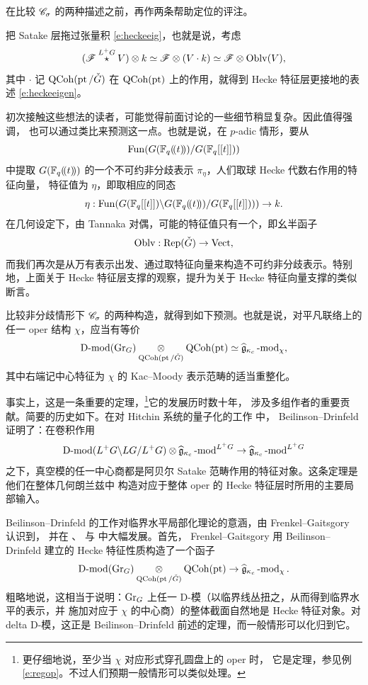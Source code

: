 在比较 $\mathscr{C}_\sigma$ 的两种描述之前，再作两条帮助定位的评注。

\begin{re}  把 Satake 层拖过张量积 \eqref{e:heckeeig}，也就是说，考虑
%
\[
     (\mathscr{F} \overset {L^+G} \star V) \otimes k \simeq \mathscr{F} \otimes (V \cdot k)
     \simeq
     \mathscr{F} \otimes \operatorname{Oblv}(V),
\]
%
其中 $\cdot$ 记 $\operatorname{QCoh}(\operatorname{pt}/\check{G})$ 在 $\operatorname{QCoh}(\operatorname{pt})$ 上的作用，就得到 Hecke 特征层更接地的表述
\eqref{e:heckeeigen}。
	\end{re}

	\begin{re} 初次接触这些想法的读者，可能觉得前面讨论的一些细节稍显复杂。因此值得强调，
	也可以通过类比来预测这一点。也就是说，在 $p$-adic 情形，要从
	\[
	  \operatorname{Fun}( G(\mathbb{F}_q(\!(t)\!))/G(\mathbb{F}_q[[t]]))
	\]
	中提取 $G(\mathbb{F}_q(\!(t)\!))$ 的一个不可约非分歧表示 $\pi_{\eta}$，人们取球 Hecke 代数右作用的特征向量，
	特征值为 $\eta$，即取相应的同态
	\[   \eta: \operatorname{Fun}(G(\mathbb{F}_q[[t]]) \backslash G(\mathbb{F}_q(\!(t)\!))/G(\mathbb{F}_q[[t]]))) \rightarrow k.\]
	 在几何设定下，由 Tannaka 对偶，可能的特征值只有一个，即幺半函子
	 \[ \operatorname{Oblv}: \operatorname{Rep}(\check{G}) \rightarrow \operatorname{Vect},\]
	  而我们再次是从万有表示出发、通过取特征向量来构造不可约非分歧表示。特别地，上面关于
	 Hecke 特征层支撑的观察，提升为关于 Hecke 特征向量支撑的类似断言。
	\end{re}

	\ssszh 比较非分歧情形下 $\mathscr{C}_{\sigma}$ 的两种构造，就得到如下预测。也就是说，对平凡联络上的
	任一 oper 结构 $\chi$，应当有等价
	\begin{equation} \label{e:locaff}
	      \operatorname{D-mod}(\operatorname{Gr}_G) \underset {\operatorname{QCoh}(\operatorname{pt} / \check{G})} \otimes \operatorname{QCoh}(\operatorname{pt}) \simeq
	      \widehat{\mathfrak{g}}_{\kappa_c}\operatorname{-mod}_\chi,
	\end{equation}
	其中右端记中心特征为 $\chi$ 的 Kac--Moody 表示范畴的适当重整化。

	事实上，这是一条重要的定理，\footnote{更仔细地说，至少当 $\chi$ 对应形式穿孔圆盘上的 oper 时，
	它是定理，参见例 \ref{e:regop}。不过人们预期一般情形可以类似处理。}它的发展历时数十年，
	涉及多组作者的重要贡献。简要的历史如下。在对 Hitchin 系统的量子化的工作 \cite{bdh} 中，
	Beilinson--Drinfeld 证明了：在卷积作用
	\[
	     \operatorname{D-mod}(L^+G \backslash LG / L^+G) \otimes \widehat{\mathfrak{g}}_{\kappa_c}\operatorname{-mod}^{L^+G} \rightarrow
	     \widehat{\mathfrak{g}}_{\kappa_c}\operatorname{-mod}^{L^+G}
	\]
	之下，真空模的任一中心商都是阿贝尔 Satake 范畴作用的特征对象。这条定理是他们在整体几何朗兰兹中
	构造对应于整体 oper 的 Hecke 特征层时所用的主要局部输入。

	\ssszh Beilinson--Drinfeld 的工作对临界水平局部化理论的意涵，由 Frenkel--Gaitsgory 认识到，
	并在 \cite{frenkelgaitsgorylocgrassmannian04}、\cite{fg06loc} 与 \cite{fgloc09} 中大幅发展。首先，
	Frenkel--Gaitsgory 用 Beilinson--Drinfeld 建立的 Hecke 特征性质构造了一个函子
	\begin{equation} \label{e:globgr}
	      \operatorname{D-mod}(\operatorname{Gr}_G)\underset {\operatorname{QCoh}(\operatorname{pt} / \check{G})} \otimes \operatorname{QCoh}(\operatorname{pt})
	      \rightarrow
	      \widehat{\mathfrak{g}}_{\kappa_c}\operatorname{-mod}_\chi.
	\end{equation}
	粗略地说，这相当于说明：$\operatorname{Gr}_G$ 上任一 D-模（以临界线丛扭之，从而得到临界水平的表示，并
	施加对应于 $\chi$ 的中心商）的整体截面自然地是 Hecke 特征对象。对 delta D-模，这正是
	Beilinson--Drinfeld 前述的定理，而一般情形可以化归到它。

